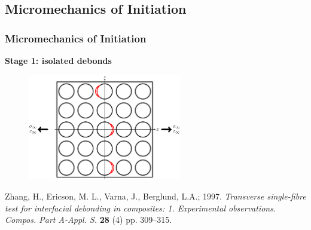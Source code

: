\documentclass[first,firstsupp,lastsupp,last,hyperref,table]{ETHclass}
\begin{document}
\subsection{Micromechanics of Initiation}

\begin{frame}
\frametitle{\vspace{0.2cm}\small Micromechanics of Initiation}
\vspace{-0.5cm}
\centering
\begin{alertblock}{\centering\scriptsize\bf Stage 1: isolated debonds}
\vspace{-0.25cm}
\begin{figure}
\centering
\includegraphics[width=0.6\textwidth]{stage1-isolateddebonds.pdf}
\end{figure}
\end{alertblock}
\vspace{-0.5cm}
{\tiny Zhang, H., Ericson, M. L., Varna, J., Berglund, L.A.; 1997. {\em\tiny Transverse single-fibre test for interfacial debonding in composites: 1. Experimental observations}. {\it\tiny Compos. Part A-Appl. S.} {\bf\tiny 28} (4) pp. 309--315.}
\end{frame}

\addtocounter{framenumber}{-1}
\end{document}

